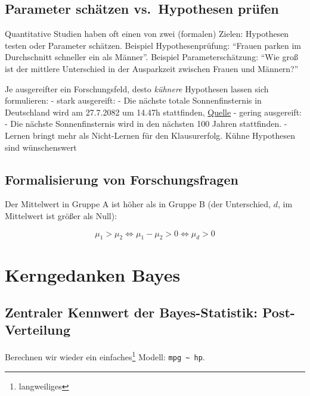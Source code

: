 \documentclass[
  a4paper,
  DIV=11]{scrreprt}
\theoremstyle{definition}
\theoremstyle{remark}
\begin{document}
\hypertarget{parameter-schuxe4tzen-vs.-hypothesen-pruxfcfen}{%
\subsection{Parameter schätzen vs.~Hypothesen
prüfen}\label{parameter-schuxe4tzen-vs.-hypothesen-pruxfcfen}}

Quantitative Studien haben oft einen von zwei (formalen) Zielen:
Hypothesen testen oder Parameter schätzen. Beispiel Hypothesenprüfung:
``Frauen parken im Durchschnitt schneller ein als Männer''. Beispiel
Parameterschätzung: ``Wie groß ist der mittlere Unterschied in der
Ausparkzeit zwischen Frauen und Männern?''

Je ausgereifter ein Forschungsfeld, desto \emph{kühnere} Hypothesen
lassen sich formulieren: - stark ausgereift: - Die nächste totale
Sonnenfinsternis in Deutschland wird am 27.7.2082 um 14.47h stattfinden,
\href{https://www.solar-eclipse.info/de/eclipse/country/DE/}{Quelle} -
gering ausgereift: - Die nächste Sonnenfinsternis wird in den nächsten
100 Jahren stattfinden. - Lernen bringt mehr als Nicht-Lernen für den
Klausurerfolg. Kühne Hypothesen sind wünschenswert 🦹

\hypertarget{formalisierung-von-forschungsfragen}{%
\subsection{Formalisierung von
Forschungsfragen}\label{formalisierung-von-forschungsfragen}}

Der Mittelwert in Gruppe A ist höher als in Gruppe B (der Unterschied,
\(d\), im Mittelwert ist größer als Null):

\[\mu_1 > \mu_2 \Leftrightarrow \mu_1 - \mu_2 > 0 \Leftrightarrow \mu_d > 0\]

\hypertarget{kerngedanken-bayes}{%
\section{Kerngedanken Bayes}\label{kerngedanken-bayes}}

\hypertarget{zentraler-kennwert-der-bayes-statistik-post-verteilung}{%
\subsection{Zentraler Kennwert der Bayes-Statistik:
Post-Verteilung}\label{zentraler-kennwert-der-bayes-statistik-post-verteilung}}

Berechnen wir wieder ein einfaches\footnote{langweiliges} Modell:
\texttt{mpg\ \textasciitilde{}\ hp}.
\end{document}
